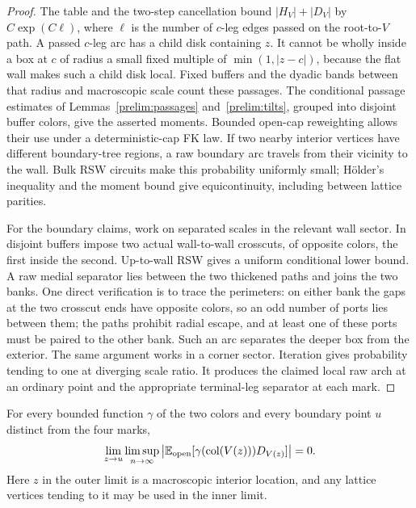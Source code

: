 \begin{proof}
The table and the two-step cancellation bound $|H_V|+|D_V|$ by
$C\exp(C\ell)$, where $\ell$ is the number of $c$-leg edges passed
on the root-to-$V$ path.  A passed $c$-leg arc has a child disk containing
$z$.  It cannot be wholly inside a box at $c$ of radius a small fixed
multiple of $\min(1,|z-c|)$, because the flat wall makes such a child
disk local.  Fixed buffers and the dyadic bands between that radius and
macroscopic scale count these passages.  The conditional passage
estimates of Lemmas~\ref{prelim:passages} and~\ref{prelim:tilts}, grouped into disjoint
buffer colors, give the asserted moments.  Bounded open-cap reweighting
allows their use under a deterministic-cap FK law.  If two nearby
interior vertices have different boundary-tree regions, a raw boundary
arc travels from their vicinity to the wall.  Bulk RSW circuits make
this probability uniformly small; H\"older's inequality and the moment
bound give equicontinuity, including between lattice parities.

For the boundary claims, work on separated scales in the relevant wall
sector.  In disjoint buffers impose two actual wall-to-wall crosscuts,
of opposite colors, the first inside the second.  Up-to-wall RSW gives
a uniform conditional lower bound.  A raw medial separator lies between
the two thickened paths and joins the two banks.  One direct verification
is to trace the perimeters: on either bank the gaps at the two crosscut
ends have opposite colors, so an odd number of ports lies between them;
the paths prohibit radial escape, and at least one of these ports must
be paired to the other bank.  Such an arc separates the deeper box
from the exterior.  The same argument works in a corner sector.
Iteration gives probability tending to one at diverging scale ratio.
It produces the claimed local raw arch at an ordinary point and the
appropriate terminal-leg separator at each mark.
\end{proof}

\begin{lemma}
\label{four:residual}
For every bounded function $\gamma$ of the two colors and every boundary
point $u$ distinct from the four marks,
\begin{equation}
 \lim_{z\to u}\limsup_{n\to\infty}
 \left|\mathbb E_{\rm open}
       [\gamma(\operatorname{col}(V(z)))D_{V(z)}]\right|=0.
 \label{four:boundary-residual}
\end{equation}
Here $z$ in the outer limit is a macroscopic interior location, and any
lattice vertices tending to it may be used in the inner limit.
\end{lemma}

